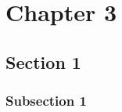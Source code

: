 
\chapter{Chapter 3}\label{chapters:chapter_3}
\vspace{-7mm}

\section{Section 1}\label{sec:ch_3_sec_1}

\subsection{Subsection 1}\label{subsec:subsec_3.1.1}


\clearpage

